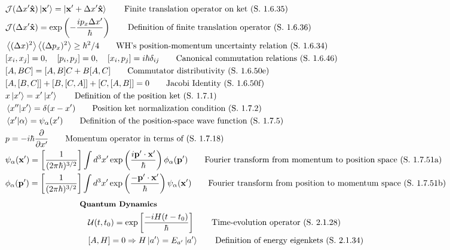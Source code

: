 \documentclass[10pt]{article}
\newcommand{\xhat}{\boldsymbol{\hat{\textbf{x}}}}
\newcommand{\ve}[1]{\boldsymbol{\mathbf{#1}}}
\newcommand{\pder}[2]{\frac{\partial #1}{\partial #2}}
\newcommand{\lrp}[1]{\left( #1 \right)}
\newcommand{\lrb}[1]{\left[ #1 \right]}
\begin{document}
\begin{multicols}{2}
\begin{align*}
		& \mathcal{J}(\Delta x' \xhat) \ket{\ve{x}'} = \ket{\ve{x}' + \Delta x' \xhat}	\tag*{Finite translation operator on ket (S. 1.6.35)} \\
		& \mathcal{J}(\Delta x' \xhat) = \exp \lrp{-\frac{i p_x \Delta x'}{\hbar}}	\tag*{Definition of finite translation operator (S. 1.6.36)} \\
		& \expval{(\Delta x)^2} \expval{(\Delta p_x)^2} \geq \hbar^2 / 4	\tag*{WH's position-momentum uncertainty relation (S. 1.6.34)} \\
		& [x_i,x_j] = 0, \quad [p_i,p_j] = 0, \quad [x_i,p_j] = i \hbar \delta_{ij}		\tag*{Canonical commutation relations (S. 1.6.46)} \\
		& [A,BC] = [A,B]C + B[A,C]	\tag*{Commutator distributivity (S. 1.6.50e)} \\
		& [A,[B,C]] + [B,[C,A]]+[C,[A,B]] = 0	\tag*{Jacobi Identity (S. 1.6.50f)} \\
		& x \ket{x'} = x' \ket{x'}	\tag*{Definition of the position ket (S. 1.7.1)} \\
		& \braket{x''}{x'} = \delta(x-x')	\tag*{Position ket normalization condition (S. 1.7.2)} \\
		& \braket{x'}{\alpha} = \psi_\alpha(x')	\tag*{Definition of the position-space wave function (S. 1.7.5)} \\
		& p = -i \hbar \pder{}{x'}	\tag*{Momentum operator in terms of (S. 1.7.18)} \\
		& \psi_\alpha (\ve{x}') = \lrb{\frac{1}{(2 \pi \hbar)^{3/2}}} \int d^3 x' \exp \lrp{\frac{i \ve{p}' \cdot \ve{x}'}{\hbar}} \phi_\alpha (\ve{p}')	\tag*{Fourier transform from momentum to position space (S. 1.7.51a)} \\
		& \phi_\alpha(\ve{p}') = \lrb{\frac{1}{(2 \pi \hbar)^{3/2}}} \int d^3 x' \exp \lrp{\frac{- \ve{p}' \cdot \ve{x}'}{\hbar}} \psi_\alpha (\ve{x}')	\tag*{Fourier transform from position to momentum space (S. 1.7.51b)} \\
	\end{align*}
	\setlength{\abovedisplayskip}{-25pt}
	\setlength{\belowdisplayskip}{0pt}
	\setlength{\abovedisplayshortskip}{0pt}
	\setlength{\belowdisplayshortskip}{0pt}
	\begin{align*} 
	& \small \hspace{-10pt} \textbf{Quantum Dynamics} \small \\
		& \mathcal{U} (t,t_0) = \exp \lrb{\frac{-iH(t-t_0)}{\hbar}}		\tag*{Time-evolution operator (S. 2.1.28)} \\
		& [A,H] = 0 \Rightarrow H \ket{a'} = E_{a'} \ket{a'}	\tag*{Definition of energy eigenkets (S. 2.1.34)} \\

\end{align*}
\end{multicols}
\end{document}
